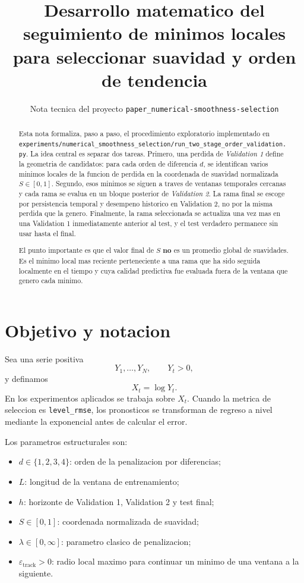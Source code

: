 \documentclass[11pt]{article}
\title{Desarrollo matematico del seguimiento de minimos locales\\
para seleccionar suavidad y orden de tendencia}
\author{Nota tecnica del proyecto \texttt{paper\_numerical-smoothness-selection}}
\date{}
\begin{document}
\maketitle

\begin{abstract}
Esta nota formaliza, paso a paso, el procedimiento exploratorio implementado en
\texttt{experiments/numerical\_smoothness\_selection/run\_two\_stage\_order\_validation.py}.
La idea central es separar dos tareas. Primero, una perdida de
\emph{Validation 1} define la geometria de candidatos: para cada orden de
diferencia \(d\), se identifican varios minimos locales de la funcion de
perdida en la coordenada de suavidad normalizada \(S\in[0,1]\). Segundo, esos
minimos se siguen a traves de ventanas temporales cercanas y cada rama se
evalua en un bloque posterior de \emph{Validation 2}. La rama final se escoge
por persistencia temporal y desempeno historico en Validation 2, no por la
misma perdida que la genero. Finalmente, la rama seleccionada se actualiza una
vez mas en una Validation 1 inmediatamente anterior al test, y el test
verdadero permanece sin usar hasta el final.

El punto importante es que el valor final de \(S\) \textbf{no} es un promedio
global de suavidades. Es el minimo local mas reciente perteneciente a una rama
que ha sido seguida localmente en el tiempo y cuya calidad predictiva fue
evaluada fuera de la ventana que genero cada minimo.
\end{abstract}

\tableofcontents

\section{Objetivo y notacion}

Sea una serie positiva
\[
Y_1,\ldots,Y_N,\qquad Y_t>0,
\]
y definamos
\[
X_t=\log Y_t.
\]
En los experimentos aplicados se trabaja sobre \(X_t\). Cuando la metrica de
seleccion es \texttt{level\_rmse}, los pronosticos se transforman de regreso a
nivel mediante la exponencial antes de calcular el error.

Los parametros estructurales son:
\begin{itemize}[leftmargin=2em]
    \item \(d\in\{1,2,3,4\}\): orden de la penalizacion por diferencias;
    \item \(L\): longitud de la ventana de entrenamiento;
    \item \(h\): horizonte de Validation 1, Validation 2 y test final;
    \item \(S\in[0,1]\): coordenada normalizada de suavidad;
    \item \(\lambda\in[0,\infty]\): parametro clasico de penalizacion;
    \item \(\varepsilon_{\mathrm{track}}>0\): radio local maximo para continuar
    un minimo de una ventana a la siguiente.
\end{itemize}
\end{document}
